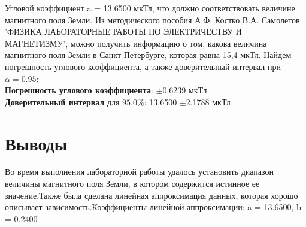 \documentclass{article}%
\begin{document}
%
Угловой коэффициент  a = 13.6500 мкТл, что должно соответствовать величине магнитного поля Земли. Из методического пособия А.Ф. Костко В.А. Самолетов 'ФИЗИКА ЛАБОРАТОРНЫЕ РАБОТЫ ПО ЭЛЕКТРИЧЕСТВУ И МАГНЕТИЗМУ', можно получить информацию о том, какова величина магнитного поля Земли в Санкт-Петербурге, которая равна 15,4 мкТл. Найдем погрешность углового коэффициента, а также доверительный интервал при $\alpha = 0.95$:\vspace{0.5cm}\\\textbf{Погрешность углового коэффициента}:  $\pm$0.6239 мкТл\vspace{0.5cm} \\\textbf{Доверительный интервал} для $95.0\%$: 13.6500 $\pm$2.1788 мкТл\vspace{0.5cm}%
\newline%
\section{Выводы}%
\label{sec:}%

%
Во время выполнения лабораторной работы удалось установить диапазон величины магнитного поля Земли, в котором содержится истинное ее значение.Также была сделана линейная аппроксимация данных, которая хорошо описывает зависимость.Коэффициенты линейной аппроксимации: a = 13.6500, b = 0.2400%
\newline%
\end{document}
